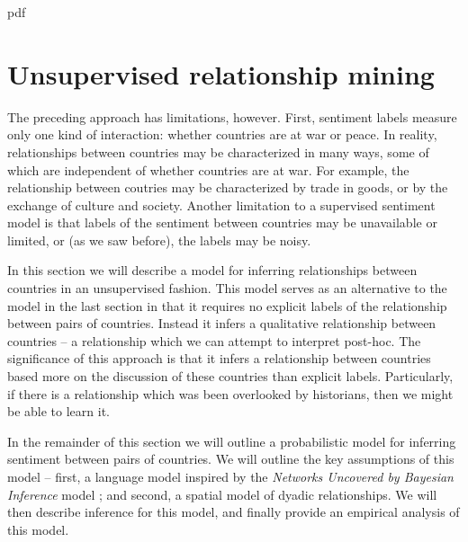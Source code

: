 pdf\section*{Unsupervised relationship mining}


The preceding approach has limitations, however.  First, sentiment
labels measure only one kind of interaction: whether countries are at
war or peace.  In reality, relationships between countries may be
characterized in many ways, some of which are independent of whether
countries are at war.  For example, the relationship between coutries
may be characterized by trade in goods, or by the exchange of culture
and society. Another limitation to a supervised sentiment model is
that labels of the sentiment between countries may be unavailable or
limited, or (as we saw before), the labels may be noisy.

In this section we will describe a model for inferring relationships
between countries in an unsupervised fashion.  This model serves as an
alternative to the model in the last section in that it requires no
explicit labels of the relationship between pairs of countries.
Instead it infers a qualitative relationship between countries -- a
relationship which we can attempt to interpret post-hoc.  The
significance of this approach is that it infers a relationship between
countries based more on the discussion of these countries than
explicit labels.  Particularly, if there is a relationship which was
been overlooked by historians, then we might be able to learn it.

In the remainder of this section we will outline a probabilistic model
for inferring sentiment between pairs of countries.  We will outline
the key assumptions of this model -- first, a language model inspired
by the \emph{Networks Uncovered by Bayesian Inference} model
\cite{chang:2009nubbi}; and second, a spatial model of dyadic
relationships. We will then describe inference for this model, and
finally provide an empirical analysis of this model.

